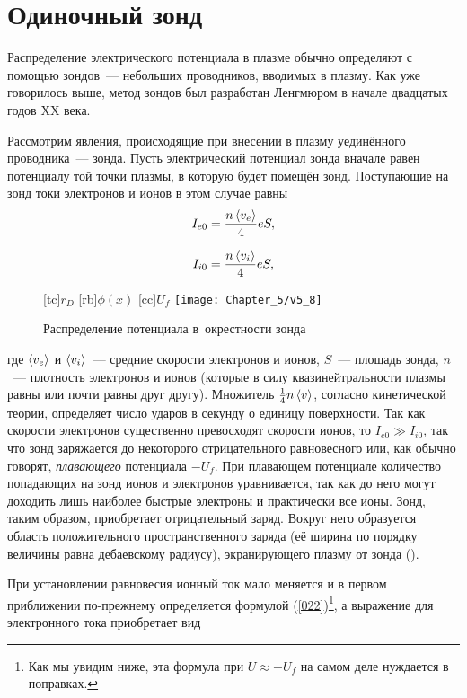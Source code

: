 \section{Одиночный зонд}

Распределение электрического потенциала в плазме обычно определяют с помощью зондов~--- небольших проводников, вводимых в
плазму. Как уже говорилось выше, метод зондов был разработан Ленгмюром в начале двадцатых годов XX века.

Рассмотрим явления, происходящие при внесении в плазму уединённого проводника~--- зонда. Пусть электрический потенциал
зонда вначале равен потенциалу той точки плазмы, в которую будет помещён зонд. Поступающие на зонд токи электронов и
ионов в этом случае равны
\begin{equation}
	\eqmark{021}
	I_{e0}=\frac{n\average{v_e}}{4}eS,
\end{equation}

\begin{equation}
	\eqmark{022}
	I_{i0}=\frac{n\average{v_i}}{4}eS,
\end{equation}


\begin{wrapfigure}{o}{0.5\textwidth}
	[tc]{$r_D$}
	[rb]{$\phi(x)$}
	[cc]{$U_f$}
	\texttt{[image: Chapter\_5/v5\_8]}
	\caption{Распределение потенциала в~окрестности зонда}
\end{wrapfigure}

где $\left< v_e \right>$ и $\left< v_i \right>$~--- средние скорости электронов и ионов, $S$~--- площадь зонда, $n$~--- плотность
электронов и ионов (которые в силу квазинейтральности плазмы равны или почти равны друг другу). Множитель $\frac14
n\left< v \right>$, согласно кинетической теории, определяет число ударов в секунду о единицу поверхности. Так как скорости
электронов существенно превосходят скорости ионов, то $I_{e0}\gg I_{i0}$, так что зонд заряжается до некоторого
отрицательного равновесного или, как обычно говорят, \textit{плавающего} потенциала $-U_f$. При плавающем потенциале
количество попадающих на зонд ионов и электронов уравнивается, так как до него могут доходить лишь наиболее быстрые
электроны и практически все ионы. Зонд, таким образом, приобретает отрицательный заряд. Вокруг него образуется область
положительного пространственного заряда (её ширина по порядку величины равна дебаевскому радиусу), экранирующего плазму
от зонда ().

При установлении равновесия ионный ток мало меняется и в первом приближении по-прежнему определяется формулой
(\eqref{022})\footnote{Как мы увидим ниже, эта формула при $U\approx -U_f$ на самом деле нуждается в поправках.}, а
выражение для электронного тока приобретает вид

